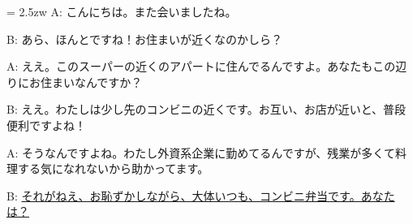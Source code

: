 \documentclass[11pt]{amsart}
\title{}
\author{}
\newenvironment{hangall}[1]{\hangindent = 2.5zw\everypar{\hangindent = 2.5zw}}{}
\begin{document}
\maketitle
\begin{hangall}{}%
A: こんにちは。また会いましたね。

B: あら、ほんとですね！お住まいが近くなのかしら？

A: ええ。このスーパーの近くのアパートに住んでるんですよ。あなたもこの辺りにお住まいなんですか？

B: ええ。わたしは少し先のコンビニの近くです。お互い、お店が近いと、普段便利ですよね！

A: そうなんですよね。わたし外資系企業に勤めてるんですが、残業が多くて料理する気になれないから助かってます。

B: \ul{それがねえ、お恥ずかしながら、大体いつも、コンビニ弁当です。あなたは？}\end{hangall}
\end{document}

